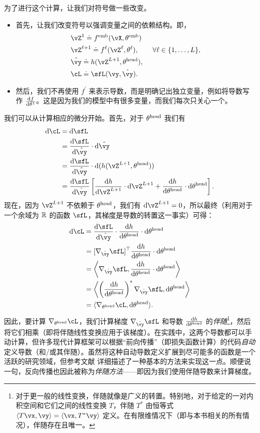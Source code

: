\documentclass[../../book-main_zh.tex]{subfiles}
\begin{document}
为了进行这个计算，让我们对符号做一些改变。
\begin{itemize}
    \item 首先，让我们改变符号以强调变量之间的依赖结构。即，
    \begin{align}
        &\vZ^{1} \doteq f^{\emb}(\vX, \theta^{\emb}) \\ 
        &\vZ^{\ell + 1} \doteq f^{\ell}(\vZ^{\ell}, \theta^{\ell}), \qquad \forall \ell \in \{1, \dots, L\}, \\
        &\hat{\vy} \doteq h(\vZ^{L+1}, \theta^{\head}), \\ 
        &\cL \doteq \sfL(\vy, \hat{\vy}).
    \end{align}
    \item 然后，我们不再使用 \(f^{\prime}\) 来表示导数，而是明确记出独立变量，例如将导数写作 \(\odv{f}{\theta^{1}}\)。这是因为我们的模型中有很多变量，而我们每次只关心一个。
\end{itemize}
我们可以从计算相应的微分开始。首先，对于 \(\theta^{\mathrm{head}}\) 我们有
\begin{align}
    \odif{\cL}
    &= \odif{\sfL} \\ 
    &= \odv{\sfL}{\hat{\vy}}\cdot\odif{\hat{\vy}} \\ 
    &= \odv{\sfL}{\hat{\vy}}\cdot\odif{{(h(\vZ^{L + 1}, \theta^{\head}))}} \\ 
    &= \odv{\sfL}{\hat{\vy}}\bs{\odv{h}{\vZ^{L + 1}}\cdot\odif{\vZ}^{L + 1} + \odv{h}{\theta^{\head}}\cdot\odif{\theta}^{\head}}.
\end{align}
现在，因为 \(\vZ^{L + 1}\) 不依赖于 \(\theta^{\mathrm{head}}\)，我们有 \(\odif{\vZ}^{L + 1} = 0\)，所以最终（利用对于一个余域为 \(\mathbb{R}\) 的函数 \(\sfL\)，其梯度是导数的转置这一事实）可得：
\begin{align}
    \odif{\cL} 
    &= \odv{\sfL}{\hat{\vy}}\cdot\odv{h}{\theta^{\head}}\cdot\odif{\theta}^{\head} \\ 
    &= [\nabla_{\hat{\vy}}\sfL]^{\top}\odv{h}{\theta^{\head}}\cdot\odif{\theta}^{\head} \\ 
    &= \ip*{\nabla_{\hat{\vy}}\sfL}{\odv{h}{\theta^{\head}}\cdot\odif{\theta}^{\head}} \\
    &= \ip*{\bp{\odv{h}{\theta^{\head}}}^{*}\nabla_{\hat{\vy}}\sfL}{\odif{\theta}^{\head}} \\ 
    &= \ip{\nabla_{\theta^{\head}}\cL}{\odif{\theta}^{\head}}.
\end{align}
因此，要计算 \(\nabla_{\theta^{\head}}\cL\)，我们计算梯度 \(\nabla_{\hat{\vy}}\sfL\) 和导数 \(\odv{h}{\theta^{\head}}\) 的\textit{伴随}\footnote{对于更一般的线性变换，伴随就像是广义的转置。特别地，对于给定的一对内积空间和它们之间的线性变换 \(T\)，伴随 \(T^{*}\) 由恒等式 \(\ip{T\vx}{\vy} = \ip{\vx}{T^{*}\vy}\) 定义。在有限维情况下（即与本书相关的所有情况），伴随存在且唯一。}，然后将它们相乘（即将伴随线性变换应用于该梯度）。在实践中，这两个导数都可以手动计算，但许多现代计算框架可以根据“前向传播”（即损失函数计算）的代码\textit{自动}定义导数（和/或其伴随）。虽然将这种自动导数定义扩展到尽可能多的函数是一个活跃的研究领域，但参考文献 \cite{bright2025matrix} 详细描述了一种基本的方法来实现这一点。顺便说一句，反向传播也因此被称为\textit{伴随方法}——即因为我们使用伴随导数来计算梯度。
\end{document}
